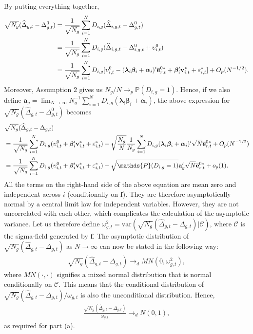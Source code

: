 \documentclass[12pt,fleqn]{article}
\def\*#1{\mathbf{#1}}
\def\+#1{\boldsymbol{#1}}
\begin{document}
By putting everything together, 
\begin{align}
 \sqrt{N_g}(\widehat \Delta_{g,t} - \Delta_{g,t}^0) & = \frac{1}{\sqrt{N_g}} \sum_{i= 1}^{N} D_{i,g} (\widehat \Delta_{i,g,t} - \Delta_{g,t}^0) \notag\\
& = \frac{1}{\sqrt{N_g}} \sum_{i= 1}^{N} D_{i,g} (\widehat \Delta_{i,g,t} - \Delta_{i,g,t}^0 + \upsilon_{i,t}^0) \notag\\
& = \frac{1}{\sqrt{N_g}} \sum_{i= 1}^{N} D_{i,g} [\upsilon_{i,t}^0 - (\+\lambda_i\+\beta_i + \+\alpha_i)'\overline{\*e}_{r,t}^{0\ast} + \+\beta_i'\*v_{i,t}^* + \varepsilon_{i,t}^* ] + O_p(N^{-1/2}) .
\end{align}
Moreover, Assumption 2 gives us $N_g/N \to_p \mathds{P}(D_{i,g} = 1)$. Hence, if we also define $\*a_g = \lim_{N\to\infty} N_g^{-1} \sum_{i= 1}^{N} D_{i,g} (\+\lambda_i\+\beta_i + \+\alpha_i)$, the above expression for $\sqrt{N_g}(\widehat \Delta_{g,t} - \Delta_{g,t}^0)$ becomes
\begin{align}
& \sqrt{N_g}(\widehat \Delta_{g,t} - \Delta_{g,t}) \notag\\
&= \frac{1}{\sqrt{N_g}}\sum_{i= 1}^{N} D_{i,g}(\upsilon_{i,t}^0  + \+\beta_i'\*v_{i,t}^* + \varepsilon_{i,t}^*) - \sqrt{\frac{N_g}{N}} \frac{1}{N_g}\sum_{i= 1}^{N} D_{i,g} (\+\lambda_i\+\beta_i + \+\alpha_i)'\sqrt{N}\overline{\*e}_{r,t}^{0\ast} + O_p(N^{-1/2}) \notag\\
&= \frac{1}{\sqrt{N_g}}\sum_{i= 1}^{N} D_{i,g} (\upsilon_{i,t}^0  + \+\beta_i'\*v_{i,t}^* + \varepsilon_{i,t}^* ) - \sqrt{\mathds{P}(D_{i,g} = 1)}\*a_g'\sqrt{N}\overline{\*e}_{r,t}^{0*} + o_p(1).
\end{align}
All the terms on the right-hand side of the above equation are mean zero and independent across $i$ (conditionally on $\*f$). They are therefore asymptotically normal by a central limit law for independent variables. However, they are not uncorrelated with each other, which complicates the calculation of the asymptotic variance. Let us therefore define $\omega_{g,t}^2 = \mathrm{var}(\sqrt{N_g}(\widehat \Delta_{g,t} - \Delta_{g,t})  |\mathcal{C})$, where $\mathcal{C}$ is the sigma-field generated by $\*f$. The asymptotic distribution of $\sqrt{N_g}(\widehat \Delta_{g,t} - \Delta_{g,t})$ as $N\to\infty$ can now be stated in the following way:
\begin{align}
\sqrt{N_g}(\widehat \Delta_{g,t} - \Delta_{g,t}) \to_d MN(0, \omega_{g,t}^2 ),
\end{align}
where $MN(\cdot,\cdot)$ signifies a mixed normal distribution that is normal conditionally on $\mathcal{C}$. This means that the conditional distribution of $\sqrt{N_g}(\widehat \Delta_{g,t} - \Delta_{g,t})/\omega_{g,t}$ is also the unconditional distribution. Hence,
\begin{align}
\frac{\sqrt{N_g}(\widehat \Delta_{g,t} - \Delta_{g,t})}{\omega_{g,t}} \to_d N(0, 1),
\end{align}
as required for part (a). 
\end{document}
